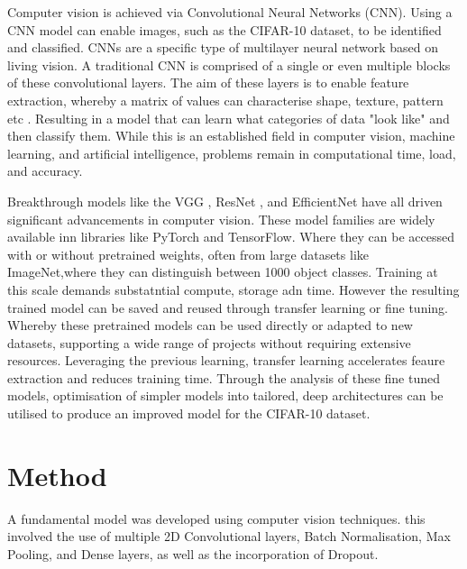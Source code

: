 \documentclass[10pt,twocolumn,letterpaper]{article}
\begin{document}
Computer vision is achieved via Convolutional Neural Networks (CNN). Using a CNN model can enable images, such as the CIFAR-10 dataset, to be identified and classified. CNNs are a specific type of multilayer neural network based on living vision. A traditional CNN is comprised of a single or even multiple blocks of these convolutional layers. The aim of these layers is to enable feature extraction, whereby a matrix of values can characterise shape, texture, pattern etc \cite{recent_trends}. Resulting in a model that can learn what categories of data "look like" and then classify them. While this is an established field in computer vision, machine learning, and artificial intelligence, problems remain in computational time, load, and accuracy. 

Breakthrough models like the VGG \cite{original_vgg}, ResNet \cite{original_resnet}, and EfficientNet \cite{original_efficientnet} have all driven significant advancements in computer vision. These model families are widely available inn libraries like PyTorch and TensorFlow. Where they can be accessed with or without pretrained weights, often from large datasets like ImageNet,where they can distinguish between 1000 object classes. Training at this scale demands substatntial compute, storage adn time. However the resulting trained model can be saved and reused through transfer learning or fine tuning. Whereby these pretrained models can be used directly or adapted to new datasets, supporting a wide range of projects without requiring extensive resources. Leveraging the previous learning, transfer learning accelerates feaure extraction and reduces training time. Through the analysis of these fine tuned models, optimisation of simpler models into tailored, deep architectures can be utilised to produce an improved model for the CIFAR-10 dataset.


\section{Method}
\label{sec:method}
A fundamental model was developed using computer vision techniques. this involved the use of multiple 2D Convolutional layers, Batch Normalisation, Max Pooling, and Dense layers, as well as the incorporation of Dropout.
\end{document}
